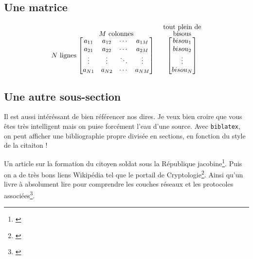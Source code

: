 \subsection{Une matrice}
\[
  N\textrm{ lignes}
  \stackrel{\mbox{$M$ colonnes}}{%
    \begin{bmatrix}
    a_{11} & a_{12} & \cdots & a_{1M} \\
    a_{21} & a_{22} & \cdots & a_{2M} \\
    \vdots & \vdots & \ddots & \vdots \\
    a_{N1} & a_{N2} & \cdots & a_{NM}
    \end{bmatrix}%
  }\ \quad
  \stackrel{\stackrel{\mbox{tout plein de}}{\mbox{bisous}}}{%
    \begin{bmatrix}
    bisou_1 \\
    bisou_2 \\
    \vdots \\
    bisou_N
    \end{bmatrix}%
   }
\]

\subsection{Une autre sous-section}
Il est aussi intéréssant de bien référencer nos dires.  Je veux bien croire que vous êtes très intelligent mais on puise forcément l'eau d'une source.
Avec \texttt{biblatex}, on peut afficher une bibliographie propre divisée en sections, en fonction du style de la citaiton !

Un article sur la formation du citoyen soldat sous la République jacobine\footnote{\cite{guiragossian:hal-02115427}}.
Puis on a de très bons liens Wikipédia tel que le portail de Cryptologie\footnote{\cite{crypto}}. 
Ainsi qu'un livre à absolument lire pour comprendre les couches réseaux et les protocoles associées\footnote{\cite{topdownApproach}}.